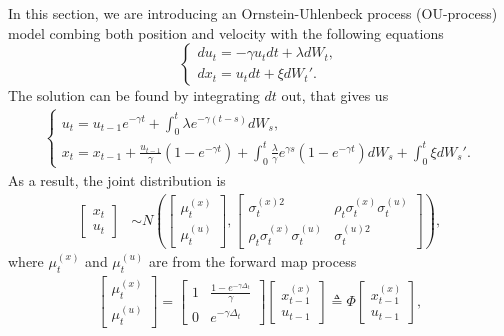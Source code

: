 In this section, we are introducing an Ornstein-Uhlenbeck process (OU-process) model combing both position and velocity with the following equations  
\begin{equation}\label{OUprocess}
\begin{cases}
du_t = -\gamma u_t dt+ \lambda dW_t,\\
dx_t = u_t dt+\xi dW_t'.
\end{cases}
\end{equation}
The solution can be found by integrating $dt$ out, that gives us 
\begin{align}
\begin{cases}
u_t =u_{t-1}e^{-\gamma t} +\int_{0}^{t} \lambda e^{-\gamma (t-s)}dW_s,\\
x_t =x_{t-1} +\frac{u_{t-1}}{\gamma}\left(1- e^{-\gamma t}\right) + \int_{0}^{t} \frac{\lambda}{\gamma}e^{\gamma  s} \left(1-e^{-\gamma t}\right)dW_s + \int_{0}^{t}\xi dW_s'.
\end{cases}
\end{align}
As a result, the joint distribution is 
\begin{align}
\begin{bmatrix} x_t \\ u_t \end{bmatrix} &\sim N\left(
\begin{bmatrix}\mu_t^{(x)} \\ \mu_t^{(u)}  \end{bmatrix} , 
\begin{bmatrix}
\sigma_t^{(x)2} & \rho_t\sigma_t^{(x)} \sigma_t^{(u)} \\
\rho_t\sigma_t^{(x)} \sigma_t^{(u)} & \sigma_t^{(u)2}
\end{bmatrix} \right),
\end{align}
where $\mu_t^{(x)}$ and $\mu_t^{(u)} $ are from the forward map process 
\begin{align}
\begin{bmatrix}\mu_t^{(x)} \\ \mu_t^{(u)}  \end{bmatrix}  = 
\begin{bmatrix}
1 & \frac{1-e^{-\gamma \Delta_t}}{\gamma} \\ 0 &  e^{-\gamma \Delta_t}
\end{bmatrix}  \begin{bmatrix} x_{t-1}^{(x)} \\ u_{t-1}  \end{bmatrix} \triangleq \Phi \begin{bmatrix} x_{t-1}^{(x)} \\ u_{t-1}  \end{bmatrix},
\end{align}
